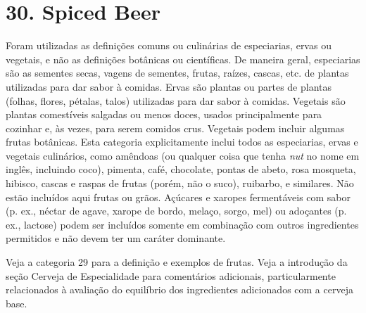\section*{30. Spiced Beer}

Foram utilizadas as definições comuns ou culinárias de especiarias, ervas ou vegetais, e não as definições botânicas ou científicas. De maneira geral, especiarias são as sementes secas, vagens de sementes, frutas, raízes, cascas, etc. de plantas utilizadas para dar sabor à comidas. Ervas são plantas ou partes de plantas (folhas, flores, pétalas, talos) utilizadas para dar sabor à comidas. Vegetais são plantas comestíveis salgadas ou menos doces, usados principalmente para cozinhar e, às vezes, para serem comidos crus. Vegetais podem incluir algumas frutas botânicas. Esta categoria explicitamente inclui todos as especiarias, ervas e vegetais culinários, como amêndoas (ou qualquer coisa que tenha \textit{nut} no nome em inglês, incluindo coco), pimenta, café, chocolate, pontas de abeto, rosa mosqueta, hibisco, cascas e raspas de frutas (porém, não o suco), ruibarbo, e similares. Não estão incluídos aqui frutas ou grãos. Açúcares e xaropes fermentáveis com sabor (p. ex., néctar de agave, xarope de bordo, melaço, sorgo, mel) ou adoçantes (p. ex., lactose) podem ser incluídos somente em combinação com outros ingredientes permitidos e não devem ter um caráter dominante.

Veja a categoria 29 para a definição e exemplos de frutas. Veja a introdução da seção Cerveja de Especialidade para comentários adicionais, particularmente relacionados à avaliação do equilíbrio dos ingredientes adicionados com a cerveja base.
